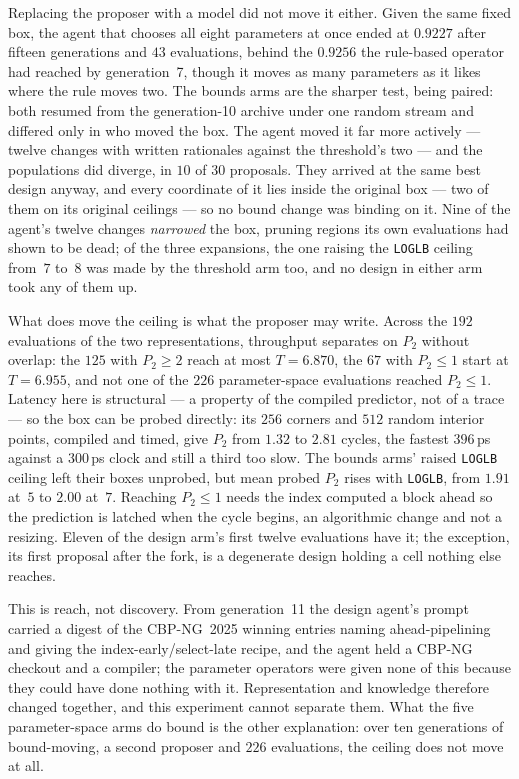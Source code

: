 \documentclass[conference]{IEEEtran}
\begin{document}
Replacing the proposer with a model did not move it either. Given the same fixed
box, the agent that chooses all eight parameters at once ended at $0.9227$ after
fifteen generations and $43$ evaluations, behind the $0.9256$ the rule-based
operator had reached by generation~7, though it moves as many parameters as it
likes where the rule moves two. The bounds arms are the sharper test, being
paired: both resumed from the generation-10 archive under one random stream and
differed only in who moved the box. The
agent moved it far more actively --- twelve changes with written rationales
against the threshold's two --- and the populations did diverge, in $10$ of $30$
proposals. They arrived at the same best design anyway, and every
coordinate of it lies inside the original box --- two of them on its original
ceilings --- so no bound change was binding on it. Nine of the agent's twelve
changes \emph{narrowed} the box, pruning regions its own evaluations had shown
to be dead; of the three expansions, the one raising the \texttt{LOGLB} ceiling
from~$7$ to~$8$ was made by the threshold arm too, and no design in either arm
took any of them up.

What does move the ceiling is what the proposer may write. Across the $192$
evaluations of the two representations, throughput separates on $P_2$ without
overlap: the $125$ with $P_2\ge2$ reach at most $T=6.870$, the $67$ with
$P_2\le1$ start at $T=6.955$, and not one of the $226$ parameter-space
evaluations reached $P_2\le1$. Latency here is structural --- a property of the
compiled predictor, not of a trace --- so the box can be probed directly: its
$256$ corners and $512$ random interior points, compiled and timed, give $P_2$
from $1.32$ to $2.81$ cycles, the fastest $396$\,ps against a $300$\,ps clock
and still a third too slow. The bounds arms' raised \texttt{LOGLB} ceiling left
their boxes unprobed, but mean probed $P_2$ rises with \texttt{LOGLB}, from
$1.91$ at~$5$ to $2.00$ at~$7$. Reaching $P_2\le1$ needs the index computed a block ahead so the prediction is
latched when the cycle begins, an algorithmic change and not a resizing. Eleven
of the design arm's first twelve evaluations have it; the exception, its first
proposal after the fork, is a degenerate design holding a cell nothing else
reaches.

This is reach, not discovery. From generation~11 the design agent's prompt
carried a digest of the CBP-NG~2025 winning entries naming ahead-pipelining and
giving the index-early/select-late recipe, and the agent held a CBP-NG checkout
and a compiler; the parameter operators were given none of this because they
could have done nothing with it. Representation and knowledge therefore changed
together, and this experiment cannot separate them. What the five
parameter-space arms do bound is the other explanation: over ten generations of
bound-moving, a second proposer and $226$ evaluations, the ceiling does not move
at all.
\end{document}
